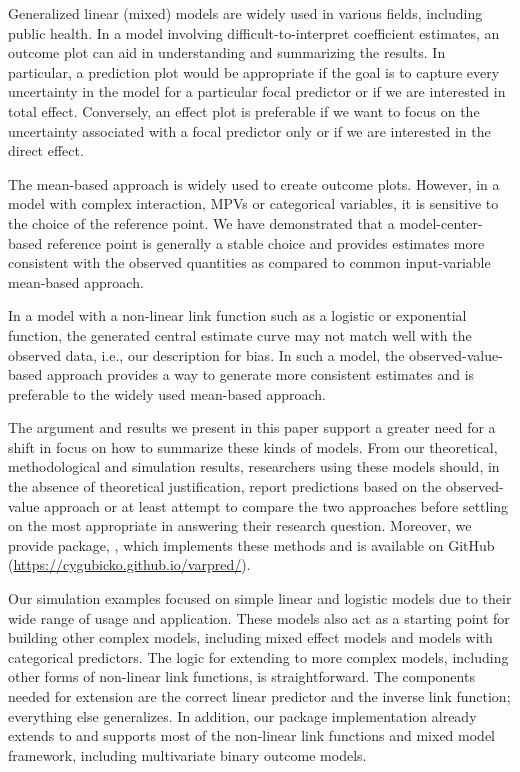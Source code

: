 Generalized linear (mixed) models are widely used in various fields, including public health. In a model involving difficult-to-interpret coefficient estimates, an outcome plot can aid in understanding and summarizing the results. In particular, a prediction plot would be appropriate if the goal is to capture every uncertainty in the model for a particular focal predictor or if we are interested in total effect. Conversely, an effect plot is preferable if we want to focus on the uncertainty associated with a focal predictor only or if we are interested in the direct effect.

The mean-based approach is widely used to create outcome plots. However, in a model with complex interaction, MPVs or categorical variables, it is sensitive to the choice of the reference point. We have demonstrated that a model-center-based reference point is generally a stable choice and provides estimates more consistent with the observed quantities as compared to common input-variable mean-based approach.

In a model with a non-linear link function such as a logistic or exponential function, the generated central estimate curve may not match well with the observed data, i.e., our description for bias. In such a model, the observed-value-based approach provides a way to generate more consistent estimates and is preferable to the widely used mean-based approach.

The argument and results we present in this paper support a greater need for a shift in focus on how to summarize these kinds of models. From our theoretical, methodological and simulation results, researchers using these models should, in the absence of theoretical justification, report predictions based on the observed-value approach or at least attempt to compare the two approaches before settling on the most appropriate in answering their research question. Moreover, we provide  package, , which implements these methods and is available on GitHub (\href{https://cygubicko.github.io/varpred/}{https://cygubicko.github.io/varpred/}).

Our simulation examples focused on simple linear and logistic models due to their wide range of usage and application. These models also act as a starting point for building other complex models, including mixed effect models and models with categorical predictors. The logic for extending to more complex models, including other forms of non-linear link functions, is straightforward. The components needed for extension are the correct linear predictor and the inverse link function; everything else generalizes. In addition, our  package implementation already extends to and supports most of the non-linear link functions and mixed model framework, including multivariate binary outcome models.

